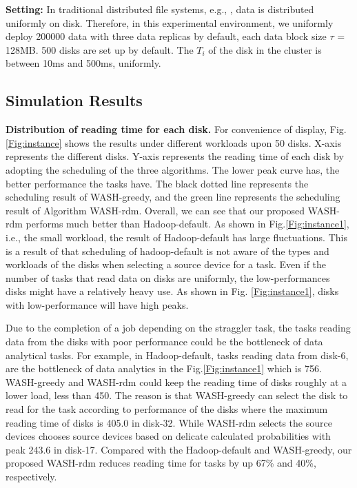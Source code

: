 \documentclass[conference]{IEEEtran}
\begin{document}
\textbf{Setting:}
In traditional distributed file systems, e.g., \cite{b19}, data is distributed uniformly on disk. Therefore, in this experimental environment, we uniformly deploy 200000 data with three data replicas by default, each data block size $\tau$ = 128MB. 500 disks are set up by default. The $T_i$ of the disk in the cluster is between 10ms and 500ms, uniformly. 



\subsection{Simulation Results}

\textbf{Distribution of reading time for each disk.} For convenience of display, Fig.\ref{Fig:instance} shows the results under different workloads upon 50 disks. X-axis represents the different disks. Y-axis represents the reading time of each disk by adopting the scheduling of the three algorithms. The lower peak curve has, the better performance the tasks have. The black dotted line represents the scheduling result of WASH-greedy, and the green line represents the scheduling result of Algorithm WASH-rdm. Overall, we can see that our proposed WASH-rdm performs much better than Hadoop-default. As shown in Fig.\ref{Fig:instance1}, i.e., the small workload, the result of Hadoop-default has large fluctuations. This is a result of that scheduling of hadoop-default is not aware of the types and workloads of the disks when selecting a source device for a task. Even if the number of tasks that read data on disks are uniformly, the low-performances disks might have a relatively heavy use. As shown in Fig. \ref{Fig:instance1}, disks with low-performance will have high peaks. 

Due to the completion of a job depending on the straggler task, the tasks reading data from the disks with poor performance could be the bottleneck of data analytical tasks. For example, in Hadoop-default, tasks reading data from disk-6, are the bottleneck of data analytics in the Fig.\ref{Fig:instance1} which is 756. WASH-greedy and WASH-rdm could keep the reading time of disks roughly at a lower load, less than 450. The reason is that WASH-greedy can select the disk to read for the task according to performance of the disks where the maximum reading time of disks is 405.0 in disk-32. While WASH-rdm selects the source devices chooses source devices based on delicate calculated probabilities with peak 243.6 in disk-17. 
Compared with the Hadoop-default and WASH-greedy, our proposed WASH-rdm reduces reading time for tasks by up 67\% and 40\%, respectively.   
\end{document}
